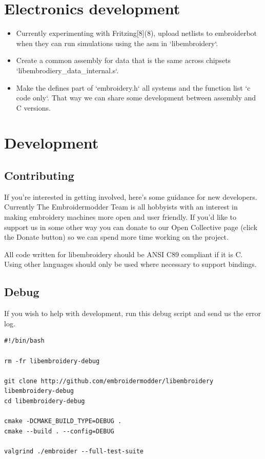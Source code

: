 \documentclass{report}
\begin{document}
\section{Electronics development}

\begin{itemize}
\item Currently experimenting with Fritzing[8](8), upload netlists to embroiderbot when they can run simulations using the asm in `libembroidery`.
\item Create a common assembly for data that is the same across chipsets `libembrodiery\_data\_internal.s`.
\item Make the defines part of `embroidery.h` all systems and the function list `c code only`. That way we can share some development between assembly and C versions.
\end{itemize}

\section{Development}

\subsection{Contributing}

If you're interested in getting involved, here's some guidance
for new developers. Currently The Embroidermodder Team is all
hobbyists with an interest in making embroidery machines more
open and user friendly. If you'd like to support us in some other way
you can donate to our Open Collective page (click the Donate button) so
we can spend more time working on the project.

All code written for libembroidery should be ANSI C89 compliant
if it is C. Using other languages should only be used where
necessary to support bindings.

\subsection{Debug}

If you wish to help with development, run this debug script and send us the error log.

\begin{lstlisting}
#!/bin/bash

rm -fr libembroidery-debug

git clone http://github.com/embroidermodder/libembroidery libembroidery-debug
cd libembroidery-debug

cmake -DCMAKE_BUILD_TYPE=DEBUG .
cmake --build . --config=DEBUG

valgrind ./embroider --full-test-suite
\end{lstlisting}
\end{document}
